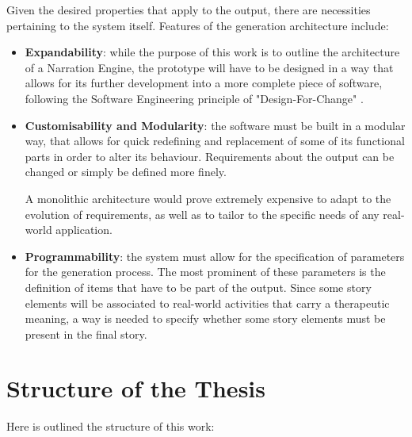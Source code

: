 \documentclass[12pt,a4paper,oneside]{report}
\begin{document}
Given the desired properties that apply to the output, there are necessities pertaining to the system itself. Features of the generation architecture include:

\begin{itemize}\setlength{\itemsep}{8pt}
\item \textbf{Expandability}: while the purpose of this work is to outline the architecture of a Narration Engine, the prototype will have to be designed in a way that allows for its further development into a more complete piece of software, following the Software Engineering principle of "Design-For-Change" \cite{designforchange}.

\item \textbf{Customisability and Modularity}: the software must be built in a modular way, that allows for quick redefining and replacement of some of its functional parts in order to alter its behaviour. Requirements about the output can be changed or simply be defined more finely. 

A monolithic architecture would prove extremely expensive to adapt to the evolution of requirements, as well as to tailor to the specific needs of any real-world application.

\item \textbf{Programmability}: the system must allow for the specification of parameters for the generation process. The most prominent of these parameters is the definition of items that have to be part of the output. Since some story elements will be associated to real-world activities that carry a therapeutic meaning, a way is needed to specify whether some story elements must be present in the final story.
\end{itemize}

\pagebreak

\section{Structure of the Thesis}
Here is outlined the structure of this work:

\bigskip
\end{document}
